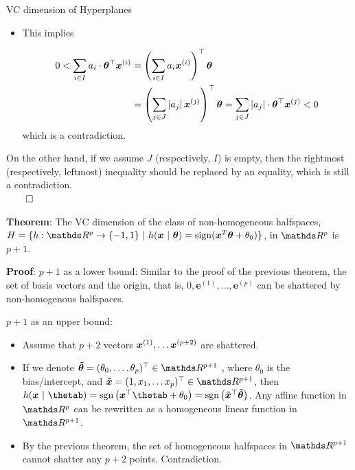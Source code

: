 \begin{vbframe}{VC dimension of Hyperplanes}
\begin{itemize}
  \item This implies
  
  \begin{equation*}
    \begin{split}
  0<\sum_{i \in I} a_{i} \cdot \bm{\theta}^\top \bm{x}^{(i)} & = \left(\sum_{i \in I} a_{i} \bm{x}^{(i)}\right)^\top \bm{\theta} \\ 
  & = \left(\sum_{j \in J}\left|a_{j}\right| \bm{x}^{(j)}\right)^\top \bm{\theta} =\sum_{j \in J}\left|a_{j}\right| \cdot \bm{\theta}^\top \bm{x}^{(j)} < 0
    \end{split}
  \end{equation*} which is a contradiction.
\end{itemize}

On the other hand, if we assume $J$ (respectively, $I$) is empty, then the rightmost (respectively, leftmost) inequality should be replaced by an equality, which is still a contradiction.\\
\hspace*{\fill}   $\qed$

\framebreak

\textbf{Theorem}: The VC dimension of the class of non-homogeneous halfspaces, $\Hspace = \{h: \R^p \to \{-1, 1\} \text{ | } h(\xv~|~\bm{\theta}) = \sign(\xv^T\bm{\theta} + \theta_0)\}$, in $\R^p$ is $p+1$.

\textbf{Proof}:
$p+1$ as a lower bound: Similar to the proof of the previous theorem, the set of basis vectors and the origin, that is, $0,\mathbf{e}^{(1)},\ldots,\mathbf{e}^{(p)}$ can be shattered by non-homogenous halfspaces.

\lz

$p+1$ as an upper bound: 
\begin{itemize}
  \item Assume that $p+2$ vectors $\bm{x}^{(1)}, \ldots \bm{x}^{(p+2)}$ are shattered. 
  \item If we denote $\bm{\tilde \theta} = (\theta_0, \ldots, \theta_p)^\top \in \R^{p+1}$ , where $\theta_0$ is the bias/intercept, and $\bm{\tilde x} = (1,x_1,\ldots x_{p})^\top \in \R^{p+1}$, then $h(\xv~|~\thetab)=\text{sgn}\left(\xv^\top \thetab+ \theta_0\right)=\text{sgn}\left(\bm{\tilde x}^\top\bm{\tilde\theta}\right)$. Any affine function in $\R^p$ can be rewritten as a homogeneous linear function in $\R^{p+1}$.
  \item By the previous theorem, the set of homogeneous halfspaces in $\R^{p+1}$ cannot shatter any $p+2$ points. Contradiction.
\end{itemize}
\end{vbframe}

